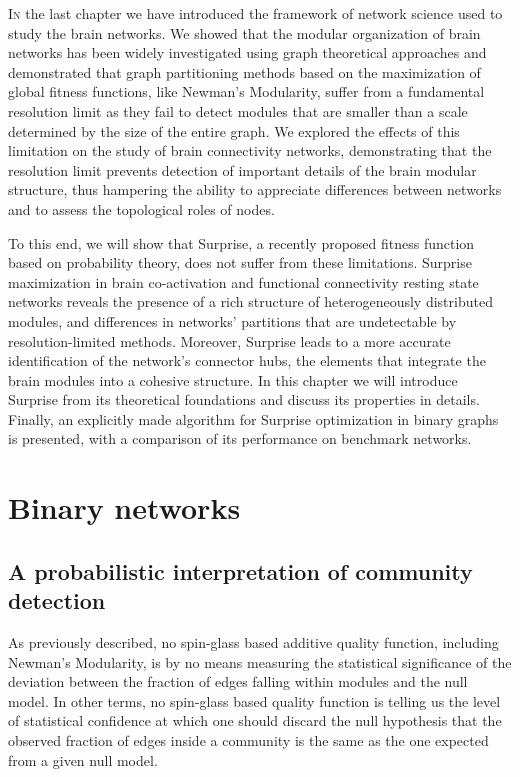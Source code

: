 \bigbreak

\lettrine{I}{n} the last chapter we have introduced the framework of network science used to study the brain networks. We showed that the modular organization of brain networks has been widely investigated using graph theoretical approaches and demonstrated that graph partitioning methods based on the maximization of global fitness functions, like Newman's Modularity, suffer from a fundamental resolution limit as they fail to detect modules that are smaller than a scale determined by the size of the entire graph.
We explored the effects of this limitation on the study of brain connectivity networks, demonstrating that the resolution limit prevents detection of important details of the brain modular structure, thus hampering the ability to appreciate differences between networks and to assess the topological roles of nodes.

To this end, we will show that Surprise, a recently proposed fitness function based on probability theory, does not suffer from these limitations.
Surprise maximization in brain co-activation and functional connectivity resting state networks reveals the presence of a rich structure of heterogeneously distributed modules, and differences in networks' partitions that are undetectable by resolution-limited methods.
Moreover, Surprise leads to a more accurate identification of the network's connector hubs, the elements that integrate the brain modules into a cohesive structure. 
In this chapter we will introduce Surprise from its theoretical foundations and discuss its properties in details. Finally, an explicitly made algorithm for Surprise optimization in binary graphs is presented, with a comparison of its performance on benchmark networks.

\section{Binary networks}
\subsection{A probabilistic interpretation of community detection}\label{sec:probability_clustering}
As previously described, no spin-glass based additive quality function, including Newman's Modularity, is by no means measuring the statistical significance of the deviation between the fraction of edges falling within modules and the null model.
In other terms, no spin-glass based quality function is telling us the level of statistical confidence at which one should discard the null hypothesis that the observed fraction of edges inside a community is the same as the one expected from a given null model.

